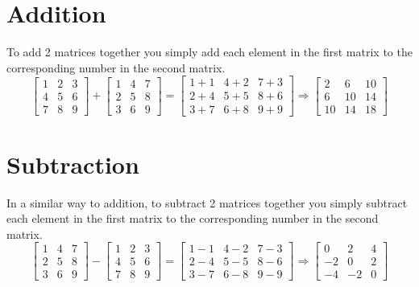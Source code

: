 \documentclass{article}
\begin{document}
\section{Addition}
To add 2 matrices together you simply add each element in the first matrix to the corresponding number in the second matrix.
\begin{equation*}
	\begin{bmatrix}
		1 & 2 & 3\\
		4 & 5 & 6\\
		7 & 8 & 9
	\end{bmatrix}
	+
	\begin{bmatrix}
		1 & 4 & 7\\
		2 & 5 & 8\\
		3 & 6 & 9
	\end{bmatrix}
	=
	\begin{bmatrix}
		1+1 & 4+2 & 7+3\\
		2+4 & 5+5 & 8+6\\
		3+7 & 6+8 & 9+9
	\end{bmatrix}
	\Rightarrow
	\begin{bmatrix}
		2 & 6 & 10\\
		6 & 10 & 14\\
		10 & 14 & 18
	\end{bmatrix}
\end{equation*}
\section{Subtraction}
In a similar way to addition, to subtract 2 matrices together you simply subtract each element in the first matrix to the corresponding number in the second matrix.
\begin{equation*}
	\begin{bmatrix}
		1 & 4 & 7\\
		2 & 5 & 8\\
		3 & 6 & 9
	\end{bmatrix}
	-
	\begin{bmatrix}
		1 & 2 & 3\\
		4 & 5 & 6\\
		7 & 8 & 9
	\end{bmatrix}
	=
	\begin{bmatrix}
		1-1 & 4-2 & 7-3\\
		2-4 & 5-5 & 8-6\\
		3-7 & 6-8 & 9-9
	\end{bmatrix}
	\Rightarrow
	\begin{bmatrix}
		0 & 2 & 4\\
		-2 & 0 & 2\\
		-4 & -2 & 0
	\end{bmatrix}
\end{equation*}
\end{document}

